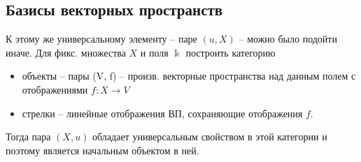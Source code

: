 \subsection*{Базисы векторных пространств}

\bigskip

К этому же универсальному элементу -- паре $(u, X)$ -- можно было подойти иначе. Для фикс. множества $X$ и поля $\Bbbk$ построить категорию
\begin{itemize}
\item объекты -- пары (V, f) -- произв. векторные пространства над данным полем с отображениями $f: X \to V$

\item стрелки -- линейные отображения ВП, сохраняющие отображения $f$.
\end{itemize}

Тогда пара $(X, u)$ обладает универсальным свойством в этой категории и поэтому является начальным объектом в ней.
